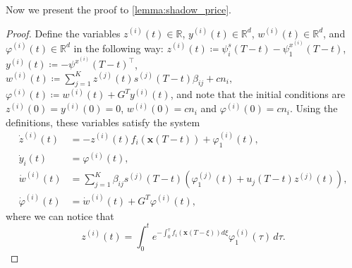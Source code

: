 \documentclass[letterpaper, 10 pt, conference]{ieeeconf}
\newcommand{\R}{\mathbb{R}}
\begin{document}
Now we present the proof to \autoref{lemma:shadow_price}.

\begin{proof}\label{proof:shadow_price}
Define the variables $z^{(i)}(t) \in \R$, $y^{(i)}(t) \in \R^d$, $w^{(i)}(t) \in \R^d$, and $\varphi^{(i)}(t) \in \R^d$ in the following way: 
$z^{(i)}(t) \coloneqq \psi_i^s(T-t)-\psi_1^{x^{(i)}}(T-t)$, $y^{(i)}(t) \coloneqq -\psi^{x^{(i)}}(T-t)^\top$, $w^{(i)}(t) \coloneqq \sum_{j=1}^K z^{(j)}(t)s^{(j)}(T-t) \beta_{ij} + c n_i,$ $\varphi^{(i)}(t) \coloneqq w^{(i)}(t) + G^T y^{(i)}(t)$,
\fi
and note that the initial conditions are $z^{(i)}(0) = y^{(i)}(0) = 0$, $w^{(i)}(0) = cn_i$ and $\varphi^{(i)}(0) = cn_i$.
Using the definitions, these variables satisfy the system
\begin{align*}
    \dot{z}^{(i)}(t) &= -z^{(i)}(t) f_i(\boldsymbol{x}(T-t)) + \varphi^{(i)}_1(t), \\
    \dot{y}_i(t) &= \varphi^{(i)}(t), \\
    \dot{w}^{(i)}(t)
    &= \sum_{j=1}^K \beta_{ij} s^{(j)}(T-t) \left(\varphi^{(j)}_1(t) + u_j(T-t) z^{(j)}(t) \right), \\
    \dot\varphi^{(i)}(t) &= \dot{w}^{(i)}(t) + G^T \varphi^{(i)}(t),
\end{align*}
where we can notice that 
\[
z^{(i)}(t) = \int_0^t e^{-\int_0^\tau f_i(\boldsymbol{x}(T-\xi)) d\xi} \varphi^{(i)}_1(\tau) \, d\tau.
\]


\end{proof}
\end{document}
